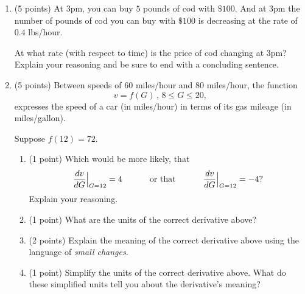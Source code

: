 \documentclass{ximera}
\begin{document}
\begin{enumerate}
\begin{explanation}
\end{explanation}

\item (5 points) At 3pm, you can buy $5$ pounds of cod with $\$100$. And at 3pm the number of pounds of cod you can buy with $\$100$ is decreasing at the rate of $0.4$ lbs/hour. 

At what rate (with respect to time) is the price of cod changing at 3pm? Explain your reasoning and be sure to end with a concluding sentence.



\item (5 points) Between speeds of $60$ miles/hour and $80$ miles/hour, the function
\[
   v = f(G) \, , \, 8\leq G \leq 20 ,
\]
expresses the speed of a car (in miles/hour) in terms of its gas mileage (in miles/gallon).

Suppose $f(12)=72$. 


\begin{enumerate}

\item (1 point) Which would be more likely, that
\[
   \frac{dv}{dG}\Big|_{G=12} = 4 \hskip 0.4 in \text{ or that } \hskip 0.4 in  \frac{dv}{dG}\Big|_{G=12} = -4?
\]
Explain your reasoning.




\item (1 point) What are the units of the correct derivative above?



\item (2 points) Explain the meaning of the correct derivative above using the language of \emph{small changes}.



\item (1 point) Simplify the units of the correct derivative above. What do these simplified units tell you about the derivative's meaning?
\end{enumerate}







\end{enumerate}
\end{document}
